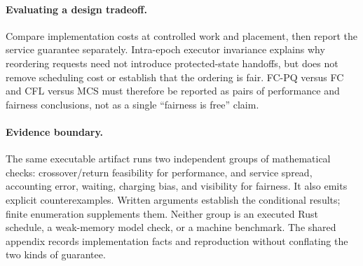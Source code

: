 \paragraph{Evaluating a design tradeoff.}
Compare implementation costs at controlled work and placement, then report
the service guarantee separately. Intra-epoch executor invariance explains
why reordering requests need not introduce protected-state handoffs, but
does not remove scheduling cost or establish that the ordering is fair.
FC-PQ versus FC and CFL versus MCS must therefore be reported as pairs of
performance and fairness conclusions, not as a single ``fairness is free''
claim.

\paragraph{Evidence boundary.}
\label{sec:evidence}
The same executable artifact runs two independent groups of mathematical
checks: crossover/return feasibility for performance, and service spread,
accounting error, waiting, charging bias, and visibility for fairness.
It also emits explicit counterexamples. Written arguments establish the
conditional results; finite enumeration supplements them. Neither group is
an executed Rust schedule, a weak-memory model check, or a machine benchmark.
The shared appendix records implementation facts and reproduction without
conflating the two kinds of guarantee.
